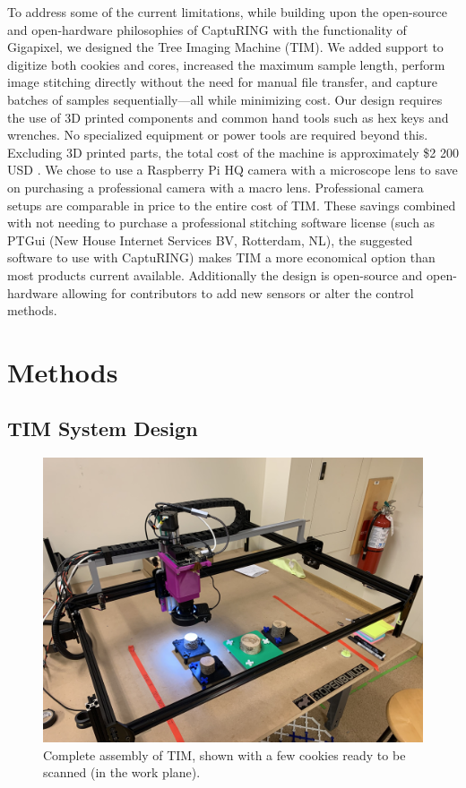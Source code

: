 \documentclass[a4paper,12pt]{article}
\begin{document}
To address some of the current limitations, while building upon the open-source and open-hardware philosophies of CaptuRING with the functionality of Gigapixel, we designed the Tree Imaging Machine (TIM).
We added support to digitize both cookies and cores, increased the maximum sample length, perform image stitching directly without the need for manual file transfer, and capture batches of samples sequentially---all while minimizing cost.
Our design requires the use of 3D printed components and common hand tools such as hex keys and wrenches. No specialized equipment or power tools are required beyond this. 
Excluding 3D printed parts, the total cost of the machine is approximately \$2 200 USD \citep[compared to the \$70 000 USD of the Gigapixel,][]{griffin_gigapixel_2021}.
We chose to use a Raspberry Pi HQ camera with a microscope lens to save on purchasing a professional camera with a macro lens. Professional camera setups are comparable in price to the entire cost of TIM.
These savings combined with not needing to purchase a professional stitching software license (such as PTGui (New House Internet Services BV, Rotterdam, NL), the suggested software to use with CaptuRING) makes TIM a more economical option than most products current available. Additionally the design is open-source and open-hardware allowing for contributors to add new sensors or alter the control methods. 

\section{Methods}

\subsection{TIM System Design} %

\begin{figure}
  \centering
  \includegraphics[height=0.5\linewidth]{../content/tina.jpg}
  \caption{Complete assembly of TIM, shown with a few cookies ready to be scanned (in the work plane).}
  \label{fig:tim_assembled}
\end{figure}
\end{document}
